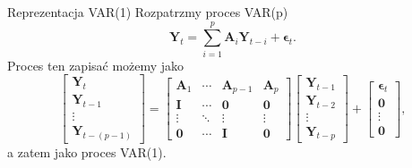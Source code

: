 \documentclass[a4paper, 11pt]{beamer}
\begin{document}
	\begin{frame}{Reprezentacja VAR(1)}
		Rozpatrzmy proces VAR(p) \[
			\boldsymbol{Y}_{t} =
				\sum_{i=1}^{p}
					\boldsymbol{A}_{i} \boldsymbol{Y}_{t-i} +
					\boldsymbol{\epsilon}_{t}.
		\]
		Proces ten zapisać możemy jako \[
			\left[\begin{matrix}
				\boldsymbol{Y}_{t}\\
				\boldsymbol{Y}_{t-1}\\
				\vdots\\
				\boldsymbol{Y}_{t-\left(p-1\right)}
			\end{matrix}\right] = \left[\begin{matrix}
				\boldsymbol{A}_{1} & 
				\cdots & \boldsymbol{A}_{p-1} & \boldsymbol{A}_{p}\\
				\boldsymbol{I} & 
				\cdots & \boldsymbol{0} & \boldsymbol{0}\\
				\vdots & \ddots & \vdots & \vdots\\
				\boldsymbol{0} & 
				\cdots & \boldsymbol{I} & \boldsymbol{0}
			\end{matrix}\right] \left[\begin{matrix}
				\boldsymbol{Y}_{t-1}\\
				\boldsymbol{Y}_{t-2}\\
				\vdots\\
				\boldsymbol{Y}_{t-p}
			\end{matrix}\right] + \left[\begin{matrix}
				\boldsymbol{\epsilon}_{t}\\
				\boldsymbol{0}\\
				\vdots\\
				\boldsymbol{0}
			\end{matrix}\right],
		\]
		a zatem jako proces VAR(1).
	\end{frame}
	
\end{document}
